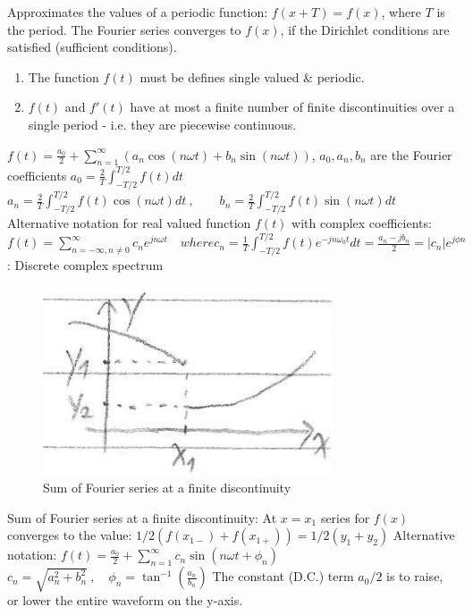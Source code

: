 \documentclass[12pt]{article}
\begin{document}
\begin{flushleft}
	\textbullet \quad Approximates the values of a periodic function: $ f(x+T) = f(x)$, where $T$ is the period. \linebreak 
	\textbullet \quad The Fourier series converges to $f(x)$, if the Dirichlet conditions are satisfied (sufficient conditions).  
	\begin{enumerate}
	\item The function $f(t)$ must be defines single valued \& periodic. 
	\item $f(t)$ and $f'(t)$ have at most a finite number of finite discontinuities over a single period - i.e. they are piecewise continuous. 
	\end{enumerate}
	\textbullet \quad $f(t) = \frac{a_0}{2} + \sum \limits_{n=1}^{\infty} \left(a_n \cos (n\omega t) + b_n \sin (n\omega t) \right) $, $a_0, a_n, b_n$ are the Fourier coefficients \linebreak 
	$a_0 = \frac{2}{T} \int_{-T/2}^{T/2} f(t) dt $ \linebreak 
	$a_n = \frac{2}{T} \int_{-T/2}^{T/2} f(t) \cos (n\omega t) dt \ , \qquad 	b_n = \frac{2}{T} \int_{-T/2}^{T/2} f(t) \sin (n \omega t) dt $ \linebreak 
	\textbullet \quad Alternative notation for real valued function $f(t)$ with complex coefficients: $f(t) = \sum \limits_{n=-\infty, n\neq 0}^{\infty} c_n e^{jn\omega t} \quad where c_n = \frac{1}{T} \int_{-T/2}^{T/2} f(t) e^{-jn \omega_0 t} dt = \frac{a_n -j b_n}{2} = |c_n| e^{j\phi n} $  :  Discrete complex spectrum \linebreak 
	
	\begin{figure}[ht]
	\centering
	\includegraphics[scale=2]{finiteDiscontinuity}
	\caption{Sum of Fourier series at a finite discontinuity}
	\label{fig:finiteDiscontinuity}
	\end{figure}	
	
	\textbullet \quad Sum of Fourier series at a finite discontinuity: At $x = x_1$ series for $f(x)$ converges to the value: $ 1/2 (f(x_{1-}) + f(x_{1+}) ) = 1/2 (y_1 + y_2) $ \linebreak 
	\textbullet \quad  Alternative notation: $f(t) = \frac{a_0}{2} + \sum \limits_{n=1}^{\infty} c_n \sin (n\omega t + \phi_n) $ \\ 
		$c_n = \sqrt{a_n^2 + b_n^2}\ , \quad \phi_n = \tan^{-1} (\frac{a_n}{b_n}) $ \linebreak 
	\textbullet \quad The constant (D.C.) term $a_0/2$ is to raise, or lower the entire waveform on the y-axis. \linebreak 
	

\end{flushleft}
\end{document}
